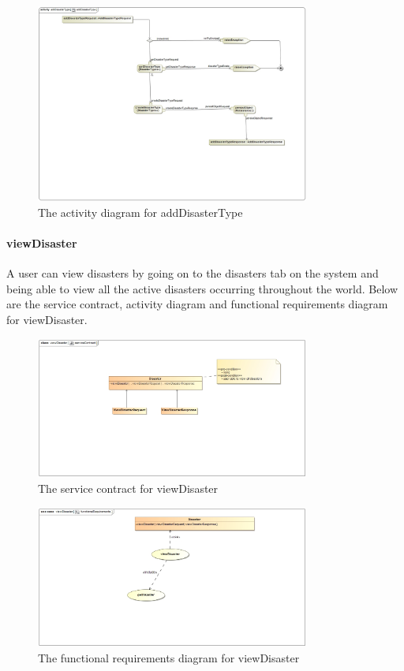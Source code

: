 \begin{figure}[ht!]
\centering
\includegraphics[width=90mm]{../images/addDisasterTypeActivityDiagram.jpg}
\caption{The activity diagram for addDisasterType \label{overflow}}
\end{figure}

\paragraph{viewDisaster}

A user can view disasters by going on to the disasters tab on the system and being able to view all the active disasters occurring throughout the world. Below are the service contract, activity diagram and functional requirements diagram for viewDisaster.

\begin{figure}[ht!]
	\centering
	\includegraphics[width=90mm]{../images/viewDisasterServiceContract.jpg}
	\caption{The service contract for viewDisaster \label{overflow}}
\end{figure}

\begin{figure}[ht!]
\centering
\includegraphics[width=90mm]{../images/viewDisasterFunctionalRequirements.jpg}
\caption{The functional requirements diagram for viewDisaster \label{overflow}}
\end{figure}

